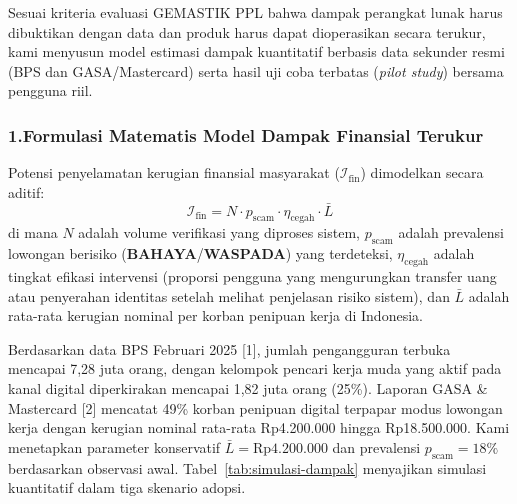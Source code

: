 \documentclass[12pt,a4paper]{article}
\begin{document}
\begin{blokkuning}
Sesuai kriteria evaluasi GEMASTIK PPL bahwa dampak perangkat lunak harus dibuktikan dengan data
dan produk harus dapat dioperasikan secara terukur, kami menyusun model estimasi dampak kuantitatif
berbasis data sekunder resmi (BPS dan GASA/Mastercard) serta hasil uji coba terbatas (\textit{pilot study})
bersama pengguna riil.

\subsubsection*{1.\quad Formulasi Matematis Model Dampak Finansial Terukur}
Potensi penyelamatan kerugian finansial masyarakat ($\mathcal{I}_{\text{fin}}$) dimodelkan secara aditif:
\begin{equation}
\mathcal{I}_{\text{fin}} = N \cdot p_{\text{scam}} \cdot \eta_{\text{cegah}} \cdot \bar{L}
\end{equation}
\noindent di mana $N$ adalah volume verifikasi yang diproses sistem, $p_{\text{scam}}$ adalah prevalensi
lowongan berisiko (\textbf{BAHAYA}/\textbf{WASPADA}) yang terdeteksi, $\eta_{\text{cegah}}$ adalah tingkat efikasi
intervensi (proporsi pengguna yang mengurungkan transfer uang atau penyerahan identitas setelah melihat
penjelasan risiko sistem), dan $\bar{L}$ adalah rata-rata kerugian nominal per korban penipuan kerja di Indonesia.

Berdasarkan data BPS Februari 2025 [1], jumlah pengangguran terbuka mencapai 7,28 juta orang, dengan
kelompok pencari kerja muda yang aktif pada kanal digital diperkirakan mencapai 1,82 juta orang (25\%).
Laporan GASA \& Mastercard [2] mencatat 49\% korban penipuan digital terpapar modus lowongan kerja dengan
kerugian nominal rata-rata Rp4.200.000 hingga Rp18.500.000. Kami menetapkan parameter konservatif
$\bar{L} = \text{Rp4.200.000}$ dan prevalensi $p_{\text{scam}} = 18\%$ berdasarkan observasi awal.
Tabel~\ref{tab:simulasi-dampak} menyajikan simulasi kuantitatif dalam tiga skenario adopsi.
\end{blokkuning}
\end{document}

